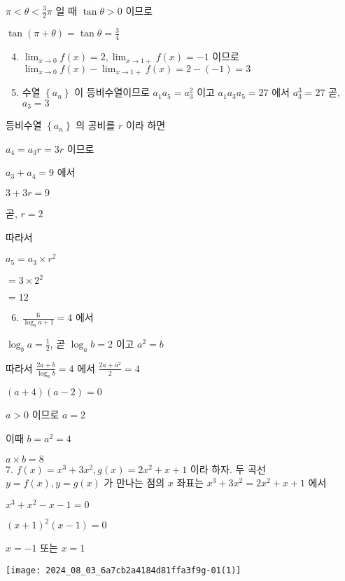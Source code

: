 \documentclass[10pt]{article}
\begin{document}
\(\pi<\theta<\frac{3}{2} \pi\) 일 때 \(\tan \theta>0\) 이므로

\(\tan (\pi+\theta)=\tan \theta=\frac{3}{4}\)

\begin{enumerate}
  \setcounter{enumi}{3}
  \item \(\lim _{x \rightarrow 0} f(x)=2, \lim _{x \rightarrow 1+} f(x)=-1\) 이므로 \(\lim _{x \rightarrow 0} f(x)-\lim _{x \rightarrow 1+} f(x)=2-(-1)=3\)

  \item 수열 \(\left\{a_{n}\right\}\) 이 등비수열이므로 \(a_{1} a_{5}=a_{3}^{2}\) 이고 \(a_{1} a_{3} a_{5}=27\) 에서 \(a_{3}^{3}=27\) 곧, \(a_{3}=3\)

\end{enumerate}

등비수열 \(\left\{a_{n}\right\}\) 의 공비를 \(r\) 이라 하면

\(a_{4}=a_{3} r=3 r\) 이므로

\(a_{3}+a_{4}=9\) 에서

\(3+3 r=9\)

곧, \(r=2\)

따라서

\(a_{5}=a_{3} \times r^{2}\)

\(=3 \times 2^{2}\)

\(=12\)

\begin{enumerate}
  \setcounter{enumi}{5}
  \item \(\frac{6}{\log _{b} a+1}=4\) 에서
\end{enumerate}

\(\log _{b} a=\frac{1}{2}\), 곧 \(\log _{a} b=2\) 이고 \(a^{2}=b\)

따라서 \(\frac{2 a+b}{\log _{a} b}=4\) 에서 \(\frac{2 a+a^{2}}{2}=4\)

\((a+4)(a-2)=0\)

\(a>0\) 이므로 \(a=2\)

이때 \(b=a^{2}=4\)

\(a \times b=8\)\\
7. \(f(x)=x^{3}+3 x^{2}, g(x)=2 x^{2}+x+1\) 이라 하자. 두 곡선 \(y=f(x), y=g(x)\) 가 만나는 점의 \(x\) 좌표는 \(x^{3}+3 x^{2}=2 x^{2}+x+1\) 에서

\(x^{3}+x^{2}-x-1=0\)

\((x+1)^{2}(x-1)=0\)

\(x=-1\) 또는 \(x=1\)

\begin{center}
\texttt{[image: 2024\_08\_03\_6a7cb2a4184d81ffa3f9g-01(1)]}
\end{center}
\end{document}
